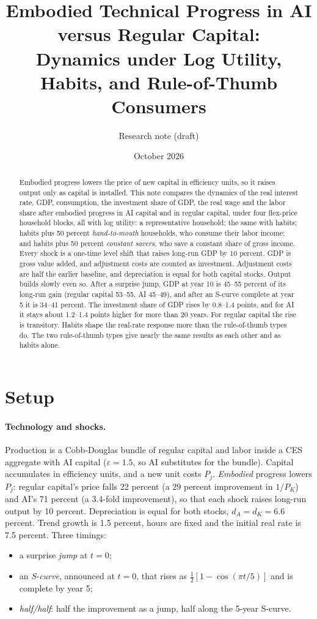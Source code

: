 \documentclass[11pt]{article}
\title{Embodied Technical Progress in AI versus Regular Capital:\\
Dynamics under Log Utility, Habits, and Rule-of-Thumb Consumers}
\author{Research note (draft)}
\date{October 2026}
\begin{document}
\maketitle

\begin{abstract}
\noindent Embodied progress lowers the price of new capital in efficiency units, so it raises output only as
capital is installed. This note compares the dynamics of the real interest rate, GDP, consumption, the investment
share of GDP, the real wage and the labor share after embodied progress in AI capital and in regular capital, under four
flex-price household blocks, all with log utility: a representative household; the same with habits; habits
plus 50 percent \emph{hand-to-mouth} households, who consume their labor income; and habits plus 50 percent
\emph{constant savers}, who save a constant share of gross income. Every shock is a one-time level shift that raises long-run
GDP by 10 percent. GDP is gross value added, and adjustment costs are counted as investment. Adjustment costs are half the earlier
baseline, and depreciation is equal for both capital stocks. Output builds slowly even so. After a surprise jump, GDP at year 10 is 45--55 percent of its long-run gain
(regular capital 53--55, AI 45--49), and after an S-curve complete at year 5 it is 34--41 percent.
The investment share of GDP rises by 0.8--1.4 points, and for AI it stays about 1.2--1.4 points higher for more than 20 years. For regular capital the rise is transitory. Habits
shape the real-rate response more than the rule-of-thumb types do. The two rule-of-thumb types give nearly the same results as each other and as habits alone.
\end{abstract}

\section{Setup}

\paragraph{Technology and shocks.} Production is a Cobb-Douglas bundle of regular capital and labor inside a CES
aggregate with AI capital ($\varepsilon=1.5$, so AI substitutes for the bundle). Capital accumulates in efficiency units, and
a new unit costs $P_j$. \emph{Embodied} progress lowers $P_j$: regular capital's price falls 22 percent (a 29 percent improvement in $1/P_K$) and AI's 71 percent
(a 3.4-fold improvement), so that each shock raises long-run output by 10 percent. Depreciation is equal for both stocks, $d_A=d_K=6.6$ percent.
Trend growth is 1.5 percent, hours are fixed and the initial real rate is 7.5 percent. Three timings:
\begin{itemize}
\item a surprise \emph{jump} at $t=0$;
\item an \emph{S-curve}, announced at $t=0$, that rises as $\tfrac12[1-\cos(\pi t/5)]$ and is complete by year 5;
\item \emph{half/half}: half the improvement as a jump, half along the 5-year S-curve.
\end{itemize}
\end{document}
